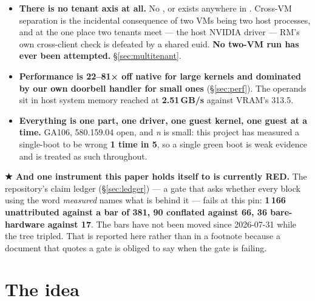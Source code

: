 \documentclass[10.5pt]{article}
\begin{document}
\begin{warnbox}
\begin{itemize}
{  hung at  (w311)."} \textbf{That is now false.} \measured{} , rev
  , one boot: a first torch process, a second with no  between,
  and a third after  \textbf{all return }, with \textbf{8/8}
  completions and \emph{identical} doorbell counts (104  + 403 ) each,
  and host  at 0  / 0  (\S\ref{sec:seqfix}). ⚠ \textbf{A
  \emph{fourth} process still fails}, above the  boundary, cause unknown; $n = 1$
  boot. \emph{Nothing here is a multi-tenancy claim.}
\item \textbf{There is no tenant axis at all.} No ,  or 
  exists anywhere in . Cross-VM separation is the incidental consequence of two VMs
  being two host processes, and at the one place two tenants meet — the host NVIDIA driver — RM's
  own cross-client check is defeated by a shared euid. \textbf{No two-VM run has ever been
  attempted.} \S\ref{sec:multitenant}.
\item \textbf{Performance is 22--81× off native for large kernels and dominated by our own
  doorbell handler for small ones} (\S\ref{sec:perf}). The operands sit in host system memory
  reached at \textbf{2.51\,GB/s} against VRAM's 313.5.
\item \textbf{Everything is one part, one driver, one guest kernel, one guest at a time.} GA106,
  580.159.04 open, and \emph{n} is small: this project has measured a single-boot  to be
  wrong \textbf{1 time in 5}, so a single green boot is weak evidence and is treated as such
  throughout.
\end{itemize}

\smallskip
\textbf{★ And one instrument this paper holds itself to is currently RED.} The repository's claim
ledger (\S\ref{sec:ledger}) — a gate that asks whether every block using the word \emph{measured}
names what is behind it — fails at this pin: \textbf{1\,166 unattributed against a bar of 381, 90
conflated against 66, 36 bare-hardware against 17}. The bars have not been moved since
2026-07-31 while the tree tripled. That is reported here rather than in a footnote because a
document that quotes a gate is obliged to say when the gate is failing.
\end{warnbox}

\section{The idea}
\end{document}
